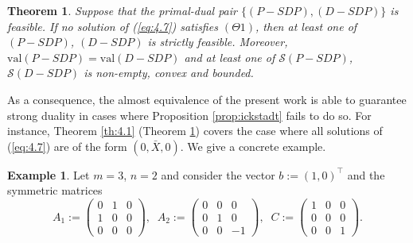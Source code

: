 \documentclass[11pt, twoside]{article}
\numberwithin{equation}{section}
\newtheorem{theorem}{Theorem}[section]
\theoremstyle{definition}
\newtheorem{example}{Example}[section]
\begin{document}
\begin{theorem}\label{th:SDPsubcase}
    Suppose that the primal-dual pair \hyperlink{primaldualsdp}{$\{(P-SDP),(D-SDP)\}$} is feasible. If no solution of (\ref{eq:4.7}) satisfies \hyperlink{theta1}{$(\Theta1)$}, then at least one of \hyperlink{primalsdp}{$(P-SDP)$}, \hyperlink{dualsdp}{$(D-SDP)$} is strictly feasible. Moreover, $\text{val}(P-SDP)=\text{val}(D-SDP)$ and at least one of $\mathcal{S}(P-SDP)$, $\mathcal{S}(D-SDP)$ is non-empty, convex and bounded.
\end{theorem}

 As a consequence, the almost equivalence of the present work is able to guarantee strong duality in cases where Proposition \ref{prop:ickstadt} fails to do so. For instance, Theorem \ref{th:4.1} (Theorem \ref{th:SDPsubcase}) covers the case where all solutions of (\ref{eq:4.7}) are of the form $(0,\bar{X},0)$. We give a concrete example.

\begin{example}\label{ex:example2}
    Let $m=3$, $n=2$ and consider the vector $b:= (1,0)^\top$ and the symmetric matrices 
\begin{equation*}
    A_1:= \begin{pmatrix}
    0 & 1 & 0  \\
    1 & 0 & 0\\
    0 & 0 & 0
\end{pmatrix},\;\;
A_2:= \begin{pmatrix}
    0 & 0 & 0  \\
    0 & 1 & 0\\
    0 & 0 & -1
\end{pmatrix},\;\;
C:= \begin{pmatrix}
    1 & 0 & 0  \\
    0 & 0 & 0\\
    0 & 0 & 1
\end{pmatrix}.
\end{equation*}
\end{example}
\end{document}

